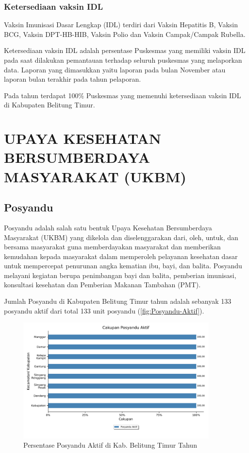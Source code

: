 \subsubsection{Ketersediaan vaksin IDL}
Vaksin Imunisasi Dasar Lengkap (IDL) terdiri dari Vaksin Hepatitis B, Vaksin BCG, Vaksin DPT-HB-HIB, Vaksin Polio dan Vaksin Campak/Campak Rubella.

Ketersediaan vaksin IDL adalah persentase Puskesmas yang memiliki vaksin IDL pada saat dilakukan pemantauan terhadap seluruh puskesmas yang melaporkan data. Laporan yang dimasukkan yaitu laporan pada bulan November atau laporan bulan terakhir pada tahun pelaporan.

Pada tahun \tP terdapat 100\% Puskesmas yang memenuhi ketersediaan vaksin IDL di Kabupaten Belitung Timur.


\section[UKBM]{UPAYA KESEHATAN BERSUMBERDAYA MASYARAKAT (UKBM)}%
\subsection{Posyandu}
Posyandu adalah salah satu bentuk Upaya Kesehatan Bersumberdaya Masyarakat (UKBM) yang dikelola dan diselenggarakan dari, oleh, untuk, dan bersama masyarakat guna memberdayakan masyarakat dan memberikan kemudahan kepada masyarakat dalam memperoleh pelayanan kesehatan dasar untuk mempercepat penurunan angka kematian ibu, bayi, dan balita. Posyandu melayani kegiatan berupa penimbangan bayi dan balita, pemberian imunisasi, konsultasi kesehatan dan Pemberian Makanan Tambahan (PMT).

Jumlah Posyandu di Kabupaten Belitung Timur tahun \tP adalah sebanyak 133 posyandu aktif dari total 133 unit posyandu (\autoref{fig:Posyandu-Aktif}).

\begin{figure}[H]
	\centering{}
	\includegraphics[width=0.9\textwidth]{bab_02/bab_02_3_posyandu}
	\caption{Persentase Posyandu Aktif di Kab. Belitung Timur Tahun \tP}
	\label{fig:Posyandu-Aktif}
\end{figure}

